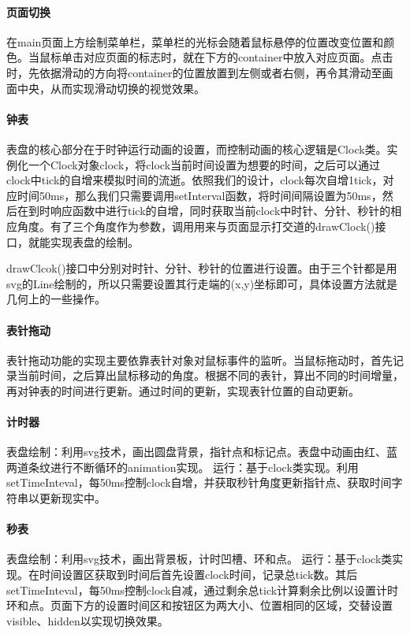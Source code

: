 \documentclass[UTF8]{ctexart}
\begin{document}
	\paragraph{页面切换}
	在main页面上方绘制菜单栏，菜单栏的光标会随着鼠标悬停的位置改变位置和颜色。当鼠标单击对应页面的标志时，就在下方的container中放入对应页面。点击时，先依据滑动的方向将container的位置放置到左侧或者右侧，再令其滑动至画面中央，从而实现滑动切换的视觉效果。
	\paragraph{钟表}
	表盘的核心部分在于时钟运行动画的设置，而控制动画的核心逻辑是Clock类。实例化一个Clock对象clock，将clock当前时间设置为想要的时间，之后可以通过clock中tick的自增来模拟时间的流逝。依照我们的设计，clock每次自增1tick，对应时间50ms，那么我们只需要调用setInterval函数，将时间间隔设置为50ms，然后在到时响应函数中进行tick的自增，同时获取当前clock中时针、分针、秒针的相应角度。有了三个角度作为参数，调用用来与页面显示打交道的drawClock()接口，就能实现表盘的绘制。
	
	drawClcok()接口中分别对时针、分针、秒针的位置进行设置。由于三个针都是用svg的Line绘制的，所以只需要设置其行走端的(x,y)坐标即可，具体设置方法就是几何上的一些操作。
	
	\paragraph{表针拖动}
	表针拖动功能的实现主要依靠表针对象对鼠标事件的监听。当鼠标拖动时，首先记录当前时间，之后算出鼠标移动的角度。根据不同的表针，算出不同的时间增量，再对钟表的时间进行更新。通过时间的更新，实现表针位置的自动更新。
	
	\paragraph{计时器}
	表盘绘制：利用svg技术，画出圆盘背景，指针点和标记点。表盘中动画由红、蓝两道条纹进行不断循环的animation实现。
	运行：基于clock类实现。利用setTimeInteval，每50ms控制clock自增，并获取秒针角度更新指针点、获取时间字符串以更新现实中。
	\paragraph{秒表}
	表盘绘制：利用svg技术，画出背景板，计时凹槽、环和点。
	运行：基于clock类实现。在时间设置区获取到时间后首先设置clock时间，记录总tick数。其后setTimeInteval，每50ms控制clock自减，通过剩余总tick计算剩余比例以设置计时环和点。页面下方的设置时间区和按钮区为两大小、位置相同的区域，交替设置visible、hidden以实现切换效果。
\end{document}
